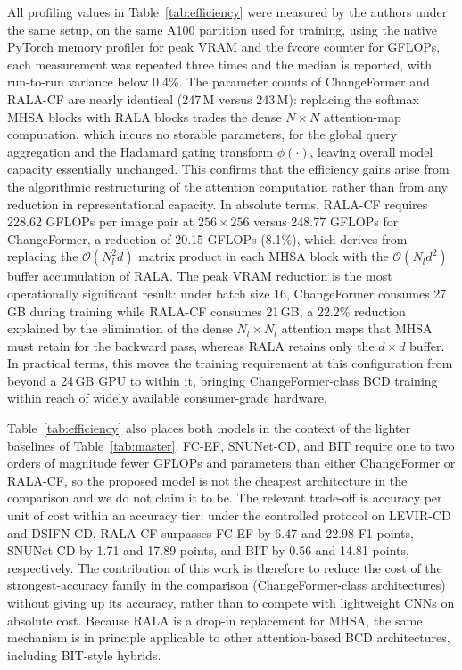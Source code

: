 \documentclass[runningheads]{llncs}
\newcommand{\journal}[1]{{\color{orange}#1}}
\begin{document}
\journal{All profiling values in Table~\ref{tab:efficiency} were measured by
the authors under the same setup, on the same A100 partition used for
training, using the native PyTorch memory profiler
for peak VRAM and the fvcore counter for GFLOPs, each measurement was
repeated three times and the median is reported, with run-to-run variance
below 0.4\%.
The parameter counts of ChangeFormer and RALA-CF are nearly identical
(247\,M versus 243\,M): replacing the softmax MHSA blocks with RALA blocks
trades the dense $N\times N$ attention-map computation, which incurs no
storable parameters, for the global query aggregation and the Hadamard gating
transform $\phi(\cdot)$, leaving overall model capacity essentially unchanged.
This confirms that the efficiency gains arise from the algorithmic
restructuring of the attention computation rather than from any reduction in
representational capacity. In absolute terms, RALA-CF requires
228.62 GFLOPs per image pair at $256\times256$ versus 248.77 GFLOPs for
ChangeFormer, a reduction of 20.15 GFLOPs (8.1\%), which derives from
replacing the $\mathcal{O}(N_l^2 d)$ matrix product in each MHSA block with
the $\mathcal{O}(N_l d^2)$ buffer accumulation of RALA. The peak VRAM
reduction is the most operationally significant result: under batch size 16,
ChangeFormer consumes 27\,GB during training while RALA-CF consumes 21\,GB, a
22.2\% reduction explained by the elimination of the dense $N_l\times N_l$
attention maps that MHSA must retain for the backward pass, whereas RALA
retains only the $d\times d$ buffer. In practical terms, this moves the
training requirement at this configuration from beyond a 24\,GB GPU to within
it, bringing ChangeFormer-class BCD training within reach of widely available
consumer-grade hardware.}

\journal{Table~\ref{tab:efficiency} also places both models in the context of
the lighter baselines of Table~\ref{tab:master}. FC-EF, SNUNet-CD, and BIT
require one to two orders of magnitude fewer GFLOPs and parameters than
either ChangeFormer or RALA-CF, so the proposed model is not the cheapest
architecture in the comparison and we do not claim it to be. The relevant
trade-off is accuracy per unit of cost within an accuracy tier: under the
controlled protocol on LEVIR-CD and DSIFN-CD, RALA-CF surpasses FC-EF by 6.47
and 22.98 F1 points, SNUNet-CD by 1.71 and 17.89 points, and BIT by 0.56 and
14.81 points, respectively. The contribution of this work is therefore to
reduce the cost of the strongest-accuracy family in the comparison
(ChangeFormer-class architectures) without giving up its accuracy, rather
than to compete with lightweight CNNs on absolute cost. Because RALA is a
drop-in replacement for MHSA, the same mechanism is in principle applicable
to other attention-based BCD architectures, including BIT-style hybrids.}
\end{document}
